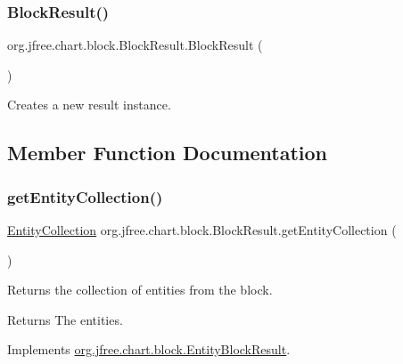 \subsubsection{\texorpdfstring{Block\+Result()}{BlockResult()}}
{\footnotesize\ttfamily org.\+jfree.\+chart.\+block.\+Block\+Result.\+Block\+Result (\begin{DoxyParamCaption}{ }\end{DoxyParamCaption})}

Creates a new result instance. 

\subsection{Member Function Documentation}
\mbox{\label{classorg_1_1jfree_1_1chart_1_1block_1_1_block_result_a5c6323fdf9c8638e8e00876f495da5f8}} 
\subsubsection{\texorpdfstring{get\+Entity\+Collection()}{getEntityCollection()}}
{\footnotesize\ttfamily \mbox{\hyperlink{interfaceorg_1_1jfree_1_1chart_1_1entity_1_1_entity_collection}{Entity\+Collection}} org.\+jfree.\+chart.\+block.\+Block\+Result.\+get\+Entity\+Collection (\begin{DoxyParamCaption}{ }\end{DoxyParamCaption})}

Returns the collection of entities from the block.

\begin{DoxyReturn}{Returns}
The entities. 
\end{DoxyReturn}


Implements \mbox{\hyperlink{interfaceorg_1_1jfree_1_1chart_1_1block_1_1_entity_block_result_ad9daa05fb5b1282fa3a2cf32c74f3070}{org.\+jfree.\+chart.\+block.\+Entity\+Block\+Result}}.

\mbox{\label{classorg_1_1jfree_1_1chart_1_1block_1_1_block_result_aa962472969e278c463732a20d0e012dc}} 
